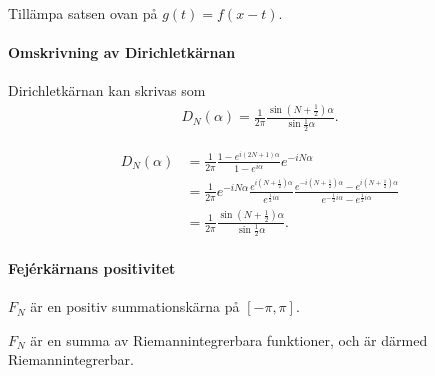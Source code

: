 \proof
Tillämpa satsen ovan på $g(t) = f(x - t)$.

\paragraph{Omskrivning av Dirichletkärnan}
Dirichletkärnan kan skrivas som
\begin{align*}
	D_{N}(\alpha) = \frac{1}{2\pi}\frac{\sin{\left(N + \frac{1}{2}\right)\alpha}}{\sin{\frac{1}{2}\alpha}}.
\end{align*}

\proof
\begin{align*}
	D_{N}(\alpha) &= \frac{1}{2\pi}\frac{1 - e^{i(2N + 1)\alpha}}{1 - e^{i\alpha}}e^{-iN\alpha} \\
	              &= \frac{1}{2\pi}e^{-iN\alpha}\frac{e^{i\left(N + \frac{1}{2}\right)\alpha}}{e^{\frac{1}{2}i\alpha}}\frac{e^{-i\left(N + \frac{1}{2}\right)\alpha} - e^{i\left(N + \frac{1}{2}\right)\alpha}}{e^{-\frac{1}{2}i\alpha} - e^{\frac{1}{2}i\alpha}} \\
	              &= \frac{1}{2\pi}\frac{\sin{\left(N + \frac{1}{2}\right)\alpha}}{\sin{\frac{1}{2}\alpha}}.
\end{align*}

\paragraph{Fejérkärnans positivitet}
$F_{N}$ är en positiv summationskärna på $[-\pi, \pi]$.

\proof
$F_{N}$ är en summa av Riemannintegrerbara funktioner, och är därmed Riemannintegrerbar.

